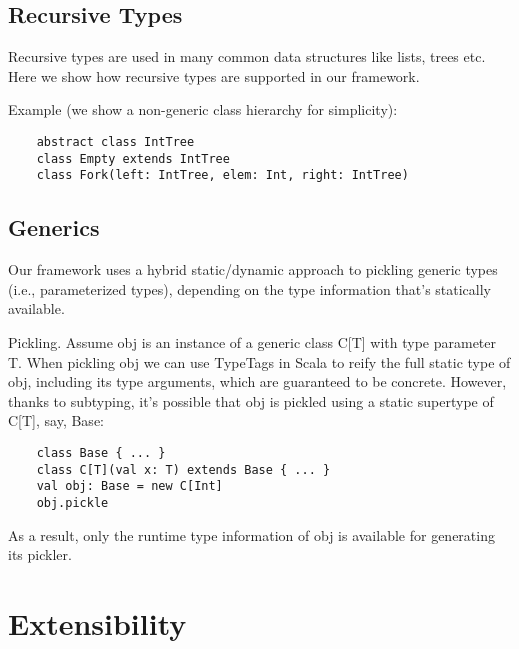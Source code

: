 \documentclass[preprint,10pt]{sigplanconf}
\begin{document}
\subsection{Recursive Types}

Recursive types are used in many common data structures like lists, trees etc. Here we show how recursive types are supported in our framework.

Example (we show a non-generic class hierarchy for simplicity):

\begin{verbatim}
    abstract class IntTree
    class Empty extends IntTree
    class Fork(left: IntTree, elem: Int, right: IntTree)
\end{verbatim}

\subsection{Generics}

Our framework uses a hybrid static/dynamic approach to pickling generic types (i.e., parameterized types), depending on the type information that's statically available.

Pickling. Assume obj is an instance of a generic class C[T] with type parameter T. When pickling obj we can use TypeTags in Scala to reify the full static type of obj, including its type arguments, which are guaranteed to be concrete. However, thanks to subtyping, it's possible that obj is pickled using a static supertype of C[T], say, Base:

\begin{verbatim}
    class Base { ... }
    class C[T](val x: T) extends Base { ... }
    val obj: Base = new C[Int]
    obj.pickle
\end{verbatim}

As a result, only the runtime type information of obj is available for generating its pickler.



\section{Extensibility}
\end{document}
